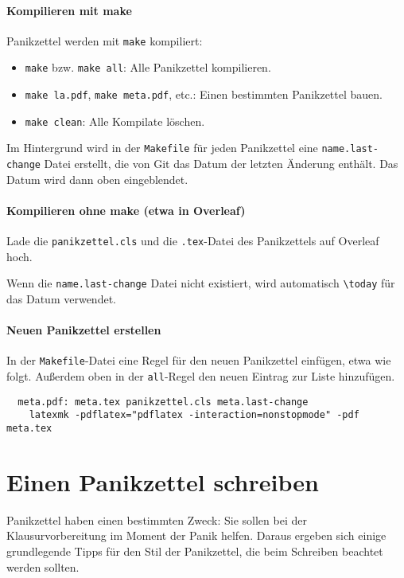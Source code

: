 \documentclass{panikzettel}
\begin{document}
\paragraph{Kompilieren mit make}

Panikzettel werden mit \texttt{make} kompiliert:
\begin{itemize}
  \item \texttt{make} bzw. \texttt{make all}: Alle Panikzettel kompilieren.
  \item \texttt{make la.pdf}, \texttt{make meta.pdf}, etc.: Einen bestimmten Panikzettel bauen.
  \item \texttt{make clean}: Alle Kompilate löschen.
\end{itemize}

{\small{}
  Im Hintergrund wird in der \texttt{Makefile} für jeden Panikzettel eine \texttt{name.last-change} Datei erstellt, die von Git das Datum der letzten Änderung enthält.
  Das Datum wird dann oben eingeblendet.
}

\paragraph{Kompilieren ohne make (etwa in Overleaf)}

Lade die \texttt{panikzettel.cls} und die \texttt{.tex}-Datei des Panikzettels auf Overleaf hoch.

Wenn die \texttt{name.last-change} Datei nicht existiert, wird automatisch \texttt{\textbackslash{}today} für das Datum verwendet.

\paragraph{Neuen Panikzettel erstellen}

In der \texttt{Makefile}-Datei eine Regel für den neuen Panikzettel einfügen, etwa wie folgt.
Außerdem oben in der \texttt{all}-Regel den neuen Eintrag zur Liste hinzufügen.
\begin{lstlisting}
  meta.pdf: meta.tex panikzettel.cls meta.last-change
	latexmk -pdflatex="pdflatex -interaction=nonstopmode" -pdf meta.tex
\end{lstlisting}

\section{Einen Panikzettel schreiben}

Panikzettel haben einen bestimmten Zweck: Sie sollen bei der Klausurvorbereitung im Moment der Panik helfen.
Daraus ergeben sich einige grundlegende Tipps für den Stil der Panikzettel, die beim Schreiben beachtet werden sollten.
\end{document}
